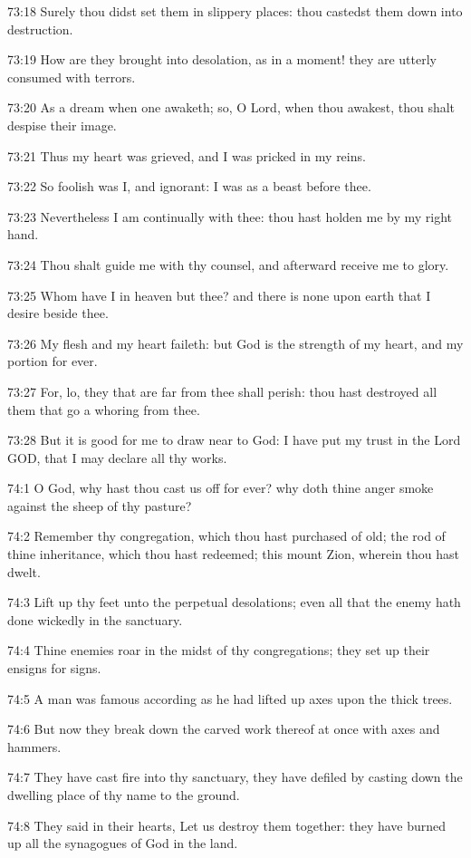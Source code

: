 73:18 Surely thou didst set them in slippery places: thou castedst them down into destruction.

73:19 How are they brought into desolation, as in a moment! they are utterly consumed with terrors.

73:20 As a dream when one awaketh; so, O Lord, when thou awakest, thou shalt despise their image.

73:21 Thus my heart was grieved, and I was pricked in my reins.

73:22 So foolish was I, and ignorant: I was as a beast before thee.

73:23 Nevertheless I am continually with thee: thou hast holden me by my right hand.

73:24 Thou shalt guide me with thy counsel, and afterward receive me to glory.

73:25 Whom have I in heaven but thee? and there is none upon earth that I desire beside thee.

73:26 My flesh and my heart faileth: but God is the strength of my heart, and my portion for ever.

73:27 For, lo, they that are far from thee shall perish: thou hast destroyed all them that go a whoring from thee.

73:28 But it is good for me to draw near to God: I have put my trust in the Lord GOD, that I may declare all thy works.



74:1 O God, why hast thou cast us off for ever? why doth thine anger smoke against the sheep of thy pasture?

74:2 Remember thy congregation, which thou hast purchased of old; the rod of thine inheritance, which thou hast redeemed; this mount Zion, wherein thou hast dwelt.

74:3 Lift up thy feet unto the perpetual desolations; even all that the enemy hath done wickedly in the sanctuary.

74:4 Thine enemies roar in the midst of thy congregations; they set up their ensigns for signs.

74:5 A man was famous according as he had lifted up axes upon the thick trees.

74:6 But now they break down the carved work thereof at once with axes and hammers.

74:7 They have cast fire into thy sanctuary, they have defiled by casting down the dwelling place of thy name to the ground.

74:8 They said in their hearts, Let us destroy them together: they have burned up all the synagogues of God in the land.

